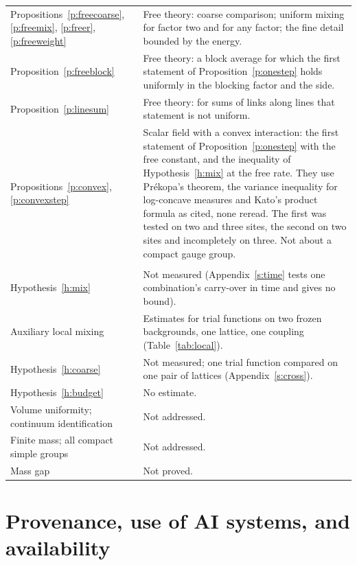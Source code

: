 \begin{table}[tbp]
\begin{tabular}{@{}>{\raggedright\arraybackslash}p{}>{\raggedright\arraybackslash}p{}@{}}
Propositions~\ref{p:freecoarse}, \ref{p:freemix}, \ref{p:freer}, \ref{p:freeweight} & Free theory: coarse comparison; uniform mixing for factor two and for any factor; the fine detail bounded by the energy. \\
Proposition~\ref{p:freeblock} & Free theory: a block average for which the first statement of Proposition~\ref{p:onestep} holds uniformly in the blocking factor and the side. \\
Proposition~\ref{p:linesum} & Free theory: for sums of links along lines that statement is not uniform. \\
Propositions~\ref{p:convex}, \ref{p:convexstep} & Scalar field with a convex interaction: the first statement of Proposition~\ref{p:onestep} with the free constant, and the inequality of Hypothesis~\ref{h:mix} at the free rate. They use Pr\'ekopa's theorem, the variance inequality for log-concave measures and Kato's product formula as cited, none reread. The first was tested on two and three sites, the second on two sites and incompletely on three. Not about a compact gauge group. \\
\addlinespace
\multicolumn{2}{@{}l}{\emph{Open}}\\[2pt]
Hypothesis~\ref{h:mix} & Not measured (Appendix~\ref{s:time} tests one combination's carry-over in time and gives no bound). \\
Auxiliary local mixing & Estimates for trial functions on two frozen backgrounds, one lattice, one coupling (Table~\ref{tab:local}). \\
Hypothesis~\ref{h:coarse} & Not measured; one trial function compared on one pair of lattices (Appendix~\ref{s:cross}). \\
Hypothesis~\ref{h:budget} & No estimate. \\
Volume uniformity; continuum identification & Not addressed. \\
Finite mass; all compact simple groups & Not addressed. \\
Mass gap & Not proved. \\
\bottomrule
\end{tabular}
\end{table}

\section{Provenance, use of AI systems, and availability}\label{s:disc}
